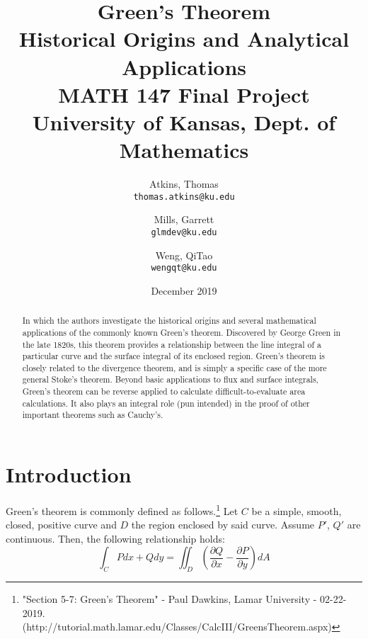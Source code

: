 \documentclass[11pt,English]{article}
\title{
Green's Theorem\\
    \large Historical Origins and Analytical Applications\\
    \small MATH 147 Final Project\\
    \small University of Kansas, Dept. of Mathematics
}
\author{
    Atkins, Thomas\\
    \texttt{thomas.atkins@ku.edu}
    \and
    Mills, Garrett\\
    \texttt{glmdev@ku.edu}
    \and
    Weng, QiTao\\
    \texttt{wengqt@ku.edu}
}
\date{December 2019}
\begin{document}
\maketitle
\begin{abstract}
    In which the authors investigate the historical origins and several mathematical applications of the commonly known Green's theorem. Discovered by George Green in the late 1820s, this theorem provides a relationship between the line integral of a particular curve and the surface integral of its enclosed region. Green's theorem is closely related to the divergence theorem, and is simply a specific case of the more general Stoke's theorem. Beyond basic applications to flux and surface integrals, Green's theorem can be reverse applied to calculate difficult-to-evaluate area calculations. It also plays an integral role (pun intended) in the proof of other important theorems such as Cauchy's.
\end{abstract}

\section{Introduction}

Green's theorem is commonly defined as follows.\footnote{"Section 5-7: Green's Theorem" - Paul Dawkins, Lamar University - 02-22-2019. (http://tutorial.math.lamar.edu/Classes/CalcIII/GreensTheorem.aspx)} Let $C$ be a simple, smooth, closed, positive curve and $D$ the region enclosed by said curve. Assume $P'$, $Q'$ are continuous. Then, the following relationship holds:
$$
\int_C{ P dx + Q dy } = \iint_D{ \left( \frac{\partial Q}{\partial x} - \frac{\partial P}{\partial y} \right) dA }
$$
\end{document}
